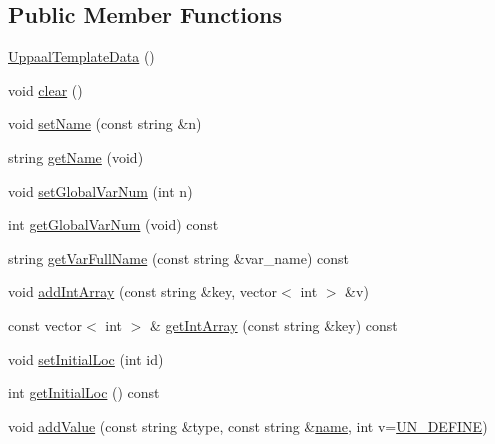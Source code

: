 \subsection*{Public Member Functions}
\begin{DoxyCompactItemize}
\item 
\mbox{\hyperlink{classgraphsat_1_1_uppaal_template_data_ab9a68c1ca51712c5d06bb118cd896fe5}{Uppaal\+Template\+Data}} ()
\item 
void \mbox{\hyperlink{classgraphsat_1_1_uppaal_template_data_a2613193aee357282a262ea27fb672ed7}{clear}} ()
\item 
void \mbox{\hyperlink{classgraphsat_1_1_uppaal_template_data_aa2b446cbeeba08745805811e07e9d45b}{set\+Name}} (const string \&n)
\item 
string \mbox{\hyperlink{classgraphsat_1_1_uppaal_template_data_ad84fdea3fae1df16f8348e91a08377c0}{get\+Name}} (void)
\item 
void \mbox{\hyperlink{classgraphsat_1_1_uppaal_template_data_af659c4040700ad25b760b279ae962f46}{set\+Global\+Var\+Num}} (int n)
\item 
int \mbox{\hyperlink{classgraphsat_1_1_uppaal_template_data_a2096eb0ebe7785f494c2bdcc02ac6bd8}{get\+Global\+Var\+Num}} (void) const
\item 
string \mbox{\hyperlink{classgraphsat_1_1_uppaal_template_data_a655ac9ea161d412b0a3301d834da15b1}{get\+Var\+Full\+Name}} (const string \&var\+\_\+name) const
\item 
void \mbox{\hyperlink{classgraphsat_1_1_uppaal_template_data_a109b3e3bd899f1b700cb28253b61f16e}{add\+Int\+Array}} (const string \&key, vector$<$ int $>$ \&v)
\item 
const vector$<$ int $>$ \& \mbox{\hyperlink{classgraphsat_1_1_uppaal_template_data_a46c3566202741551f2eb16f82282bbbb}{get\+Int\+Array}} (const string \&key) const
\item 
void \mbox{\hyperlink{classgraphsat_1_1_uppaal_template_data_a49f5c5b18a2c487342febeec63133261}{set\+Initial\+Loc}} (int id)
\item 
int \mbox{\hyperlink{classgraphsat_1_1_uppaal_template_data_a87b75bb520160d7c5d730d07d2700ec1}{get\+Initial\+Loc}} () const
\item 
void \mbox{\hyperlink{classgraphsat_1_1_uppaal_template_data_aa79e5565c392d285cba2bf2e3b874f77}{add\+Value}} (const string \&type, const string \&\mbox{\hyperlink{classgraphsat_1_1_uppaal_template_data_ad692037efd6f8c30ec30920cee8fef02}{name}}, int v=\mbox{\hyperlink{namespacegraphsat_ac495a5bfce375af1b4d9a8e3f75bef9e}{U\+N\+\_\+\+D\+E\+F\+I\+NE}})

\end{DoxyCompactItemize}
